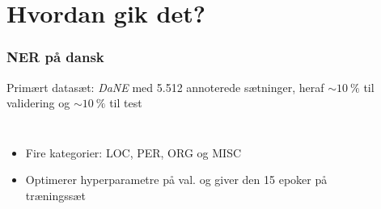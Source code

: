 \documentclass{beamer}
\newcommand{\unit}[1]{\ensuremath{\:\text{#1}}}
\newcommand{\pro}{\ensuremath{\unit{\%{}}}}
\begin{document}
\section{Hvordan gik det?}
\begin{frame}
    \frametitle{NER på dansk}
    Primært datasæt: \emph{DaNE} med 5.512 annoterede sætninger, heraf $ \sim 10\pro $ til validering og $ \sim 10\pro $ til test
    \begin{columns}
        \begin{itemize}
            \item Fire kategorier: LOC, PER, ORG og MISC
            \item Optimerer hyperparametre på val. og giver den 15 epoker på træningssæt
        \end{itemize}
        \begin{figure}[H]
            \centering
            \begin{overlayarea}{\textwidth}{4cm}
            \end{overlayarea}
        \end{figure}
    \end{columns}
\end{frame}
\end{document}
